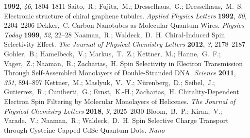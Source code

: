 \documentclass[journal=nalefd,manuscript=article,layout=twocolumn]{achemso}
\begin{document}
\begin{mcitethebibliography}{48}
  \textbf{1992}, \emph{46}, 1804--1811\relax
\mciteBstWouldAddEndPuncttrue
\mciteSetBstMidEndSepPunct{\mcitedefaultmidpunct}
{\mcitedefaultendpunct}{\mcitedefaultseppunct}\relax
\EndOfBibitem
{}
Saito,~R.; Fujita,~M.; Dresselhaus,~G.; Dresselhaus,~M.~S. Electronic structure
  of chiral graphene tubules. \emph{Applied Physics Letters} \textbf{1992},
  \emph{60}, 2204--2206\relax
\mciteBstWouldAddEndPuncttrue
\mciteSetBstMidEndSepPunct{\mcitedefaultmidpunct}
{\mcitedefaultendpunct}{\mcitedefaultseppunct}\relax
\EndOfBibitem
{}
Dekker,~C. Carbon Nanotubes as Molecular Quantum Wires. \emph{Physics Today}
  \textbf{1999}, \emph{52}, 22--28\relax
\mciteBstWouldAddEndPuncttrue
\mciteSetBstMidEndSepPunct{\mcitedefaultmidpunct}
{\mcitedefaultendpunct}{\mcitedefaultseppunct}\relax
\EndOfBibitem
{}
Naaman,~R.; Waldeck,~D.~H. Chiral-Induced Spin Selectivity Effect. \emph{The
  Journal of Physical Chemistry Letters} \textbf{2012}, \emph{3},
  2178--2187\relax
\mciteBstWouldAddEndPuncttrue
\mciteSetBstMidEndSepPunct{\mcitedefaultmidpunct}
{\mcitedefaultendpunct}{\mcitedefaultseppunct}\relax
\EndOfBibitem
{}
Gohler,~B.; Hamelbeck,~V.; Markus,~T.~Z.; Kettner,~M.; Hanne,~G.~F.; Vager,~Z.;
  Naaman,~R.; Zacharias,~H. Spin Selectivity in Electron Transmission Through
  Self-Assembled Monolayers of Double-Stranded {DNA}. \emph{Science}
  \textbf{2011}, \emph{331}, 894--897\relax
\mciteBstWouldAddEndPuncttrue
\mciteSetBstMidEndSepPunct{\mcitedefaultmidpunct}
{\mcitedefaultendpunct}{\mcitedefaultseppunct}\relax
\EndOfBibitem
{}
Kettner,~M.; Maslyuk,~V.~V.; N\"{u}renberg,~D.; Seibel,~J.; Gutierrez,~R.;
  Cuniberti,~G.; Ernst,~K.-H.; Zacharias,~H. Chirality-Dependent Electron Spin
  Filtering by Molecular Monolayers of Helicenes. \emph{The Journal of Physical
  Chemistry Letters} \textbf{2018}, \emph{9}, 2025--2030\relax
\mciteBstWouldAddEndPuncttrue
\mciteSetBstMidEndSepPunct{\mcitedefaultmidpunct}
{\mcitedefaultendpunct}{\mcitedefaultseppunct}\relax
\EndOfBibitem
{}
Bloom,~B.~P.; Kiran,~V.; Varade,~V.; Naaman,~R.; Waldeck,~D.~H. Spin Selective
  Charge Transport through Cysteine Capped {CdSe} Quantum Dots. \emph{Nano
}
\end{mcitethebibliography}
\end{document}

